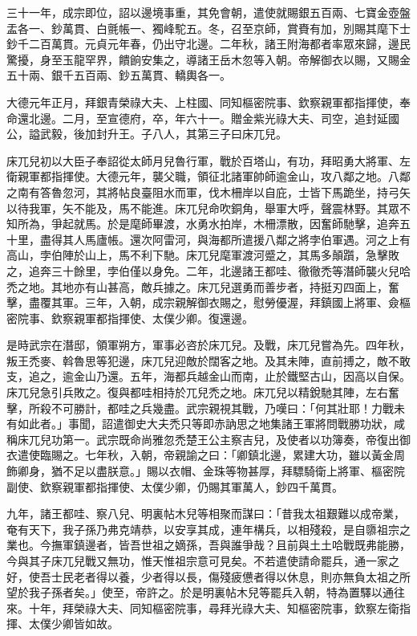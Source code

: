 \begin{pinyinscope}
 三十一年，成宗即位，詔以邊境事重，其免會朝，遣使就賜銀五百兩、七寶金壺盤盂各一、鈔萬貫、白氈帳一、獨峰駝五。冬，召至京師，賞賚有加，別賜其麾下士鈔千二百萬貫。元貞元年春，仍出守北邊。二年秋，諸王附海都者率眾來歸，邊民驚擾，身至玉龍罕界，饋餉安集之，導諸王岳木忽等入朝。帝解御衣以賜，又賜金五十兩、銀千五百兩、鈔五萬貫、轎輿各一。



 大德元年正月，拜銀青榮祿大夫、上柱國、同知樞密院事、欽察親軍都指揮使，奉命還北邊。二月，至宣德府，卒，年六十一。贈金紫光祿大夫、司空，追封延國公，謚武毅，後加封升王。子八人，其第三子曰床兀兒。



 床兀兒初以大臣子奉詔從太師月兒魯行軍，戰於百塔山，有功，拜昭勇大將軍、左衛親軍都指揮使。大德元年，襲父職，領征北諸軍帥師逾金山，攻八鄰之地。八鄰之南有答魯忽河，其將帖良臺阻水而軍，伐木柵岸以自庇，士皆下馬跪坐，持弓矢以待我軍，矢不能及，馬不能進。床兀兒命吹銅角，舉軍大呼，聲震林野。其眾不知所為，爭起就馬。於是麾師畢渡，水勇水拍岸，木柵漂散，因奮師馳擊，追奔五十里，盡得其人馬廬帳。還次阿雷河，與海都所遣援八鄰之將孛伯軍遇。河之上有高山，孛伯陣於山上，馬不利下馳。床兀兒麾軍渡河蹙之，其馬多顛躓，急擊敗之，追奔三十餘里，孛伯僅以身免。二年，北邊諸王都哇、徹徹禿等潛師襲火兒哈禿之地。其地亦有山甚高，敵兵據之。床兀兒選勇而善步者，持挺刃四面上，奮擊，盡覆其軍。三年，入朝，成宗親解御衣賜之，慰勞優渥，拜鎮國上將軍、僉樞密院事、欽察親軍都指揮使、太僕少卿。復還邊。



 是時武宗在潛邸，領軍朔方，軍事必咨於床兀兒。及戰，床兀兒嘗為先。四年秋，叛王禿麥、斡魯思等犯邊，床兀兒迎敵於闊客之地。及其未陣，直前搏之，敵不敢支，追之，逾金山乃還。五年，海都兵越金山而南，止於鐵堅古山，因高以自保。床兀兒急引兵敗之。復與都哇相持於兀兒禿之地。床兀兒以精銳馳其陣，左右奮擊，所殺不可勝計，都哇之兵幾盡。武宗親視其戰，乃嘆曰：「何其壯耶！力戰未有如此者。」事聞，詔遣御史大夫禿只等即赤訥思之地集諸王軍將問戰勝功狀，咸稱床兀兒功第一。武宗既命尚雅忽禿楚王公主察吉兒，及使者以功簿奏，帝復出御衣遣使臨賜之。七年秋，入朝，帝親諭之曰：「卿鎮北邊，累建大功，雖以黃金周飾卿身，猶不足以盡朕意。」賜以衣帽、金珠等物甚厚，拜驃騎衛上將軍、樞密院副使、欽察親軍都指揮使、太僕少卿，仍賜其軍萬人，鈔四千萬貫。



 九年，諸王都哇、察八兒、明裏帖木兒等相聚而謀曰：「昔我太祖艱難以成帝業，奄有天下，我子孫乃弗克靖恭，以安享其成，連年構兵，以相殘殺，是自隳祖宗之業也。今撫軍鎮邊者，皆吾世祖之嫡孫，吾與誰爭哉？且前與土土哈戰既弗能勝，今與其子床兀兒戰又無功，惟天惟祖宗意可見矣。不若遣使請命罷兵，通一家之好，使吾士民老者得以養，少者得以長，傷殘疲憊者得以休息，則亦無負太祖之所望於我子孫者矣。」使至，帝許之。於是明裏帖木兒等罷兵入朝，特為置驛以通往來。十年，拜榮祿大夫、同知樞密院事，尋拜光祿大夫、知樞密院事，欽察左衛指揮、太僕少卿皆如故。




\end{pinyinscope}
